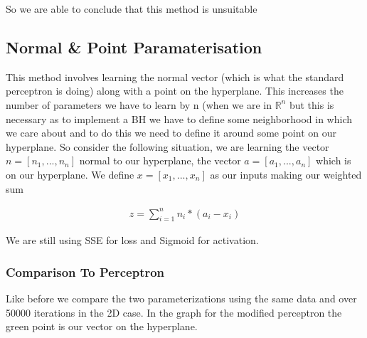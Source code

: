 \documentclass{article}
\begin{document}
So we are able to conclude that this method is unsuitable

\subsection{Normal \& Point Paramaterisation}
This method involves learning the normal vector (which is what the standard perceptron is doing) along with a point on the hyperplane. This increases the number of parameters we have to learn by n (when we are in $\mathbb{R}^n$ but this is necessary as to implement a BH we have to define some neighborhood in which we care about and to do this we need to define it around some point on our hyperplane. So consider the following situation, we are learning the vector $n = [n_1, ..., n_n]$ normal to our hyperplane, the vector $a = [a_1, ..., a_n]$ which is on our hyperplane. We define $x = [x_1, ..., x_n]$ as our inputs making our weighted sum

\begin{align*}
z = \sum_{i=1}^n n_i * (a_i - x_i)
\end{align*}

We are still using SSE for loss and Sigmoid for activation.

\subsubsection{Comparison To Perceptron}
Like before we compare the two parameterizations using the same data and over 50000 iterations in the 2D case. In the graph for the modified perceptron the green point is our vector on the hyperplane.
\end{document}
